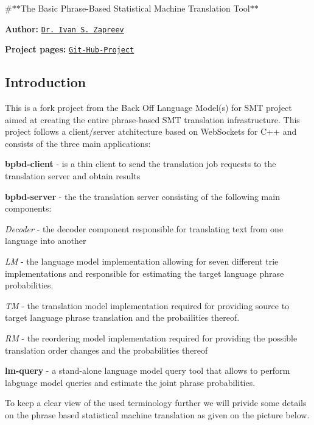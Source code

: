 \#$\ast$$\ast$\+The Basic Phrase-\/\+Based Statistical Machine Translation Tool$\ast$$\ast$

{\bfseries Author\+:} \href{https://nl.linkedin.com/in/zapreevis}{\tt Dr. Ivan S. Zapreev}

{\bfseries Project pages\+:} \href{https://github.com/ivan-zapreev/Back-Off-Language-Model-SMT}{\tt Git-\/\+Hub-\/\+Project}

\subsection*{Introduction}

This is a fork project from the Back Off Language Model(s) for S\+M\+T project aimed at creating the entire phrase-\/based S\+M\+T translation infrastructure. This project follows a client/server atchitecture based on Web\+Sockets for C++ and consists of the three main applications\+:


\begin{DoxyItemize}
\item {\bfseries bpbd-\/client} -\/ is a thin client to send the translation job requests to the translation server and obtain results
\item {\bfseries bpbd-\/server} -\/ the the translation server consisting of the following main components\+:
\begin{DoxyItemize}
\item {\itshape Decoder} -\/ the decoder component responsible for translating text from one language into another
\item {\itshape L\+M} -\/ the language model implementation allowing for seven different trie implementations and responsible for estimating the target language phrase probabilities.
\item {\itshape T\+M} -\/ the translation model implementation required for providing source to target language phrase translation and the probailities thereof.
\item {\itshape R\+M} -\/ the reordering model implementation required for providing the possible translation order changes and the probabilities thereof
\end{DoxyItemize}
\item {\bfseries lm-\/query} -\/ a stand-\/alone language model query tool that allows to perform labguage model queries and estimate the joint phrase probabilities.
\end{DoxyItemize}

To keep a clear view of the used terminology further we will privide some details on the phrase based statistical machine translation as given on the picture below.



